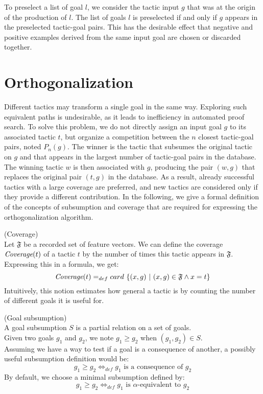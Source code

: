 \documentclass[runningheads,a4paper,draft]{svjour3}
\begin{document}
To preselect a list of goal $l$, we consider the tactic input $g$ that was 
at the origin of the production of $l$. The list of goals $l$ is preselected if 
and only if $g$ appears in the preselected tactic-goal pairs. This has the 
desirable effect that negative and positive examples derived from the same 
input goal are chosen or discarded together.  

\section{Orthogonalization}\label{sec:ortho}
Different tactics may transform a single goal in the same way. Exploring such 
equivalent paths
is undesirable, as it leads to inefficiency in automated proof search.
To solve this problem, we do not directly assign an input goal $g$ to its 
associated tactic $t$, but organize a competition between the $n$ closest 
tactic-goal pairs, noted $P_n(g)$. 
The winner is the tactic that subsumes the original tactic on $g$ and that
appears in the largest number of tactic-goal pairs in the database.
The winning tactic $w$ is then associated with $g$, producing the pair $(w,g)$ 
that replaces the original pair $(t,g)$ in the database. As a 
result, already successful tactics with a large coverage are preferred, and new 
tactics are 
considered only if they provide a different contribution. In the following, we 
give a formal definition of the concepts of subsumption and coverage that are 
required for expressing the orthogonalization algorithm.

\begin{definition} (Coverage)\\ 
Let $\mathfrak{F}$ be a recorded set of feature vectors. We can define the 
coverage $\textit{\mbox{Coverage}}(t)$ of a tactic $t$ by the number of times 
this tactic 
appears in 
$\mathfrak{F}$. Expressing this in a formula, we get:
  \[\textit{\mbox{Coverage}}(t) =_{def} card\ \lbrace (x,g)\ |\ (x,g) \in 
  \mathfrak{F} 
  \wedge x 
  = t
  \rbrace  \]
Intuitively, this notion estimates how general a tactic is by counting the 
number of different goals it is useful for.
\end{definition}


\begin{definition} (Goal subsumption)\\ 
A goal subsumption $S$ is a partial relation on a set of goals.\\
Given two goals $g_1$ and $g_2$, we note $g_1 \ge g_2$ when  $(g_1,g_2) \in 
S$.\\
Assuming we have a way to test if a goal is a consequence of another, a 
possibly useful subsumption definition would be: 
\[g_1 \ge g_2  \Leftrightarrow_{def} g_1 \mbox{ is a consequence of } g_2\]
By default, we choose a minimal subsumption defined by:
\[g_1 \ge g_2  \Leftrightarrow_{def} g_1 \mbox{ is }\alpha\mbox{-equivalent 
to } g_2\]
\end{definition}
\end{document}
